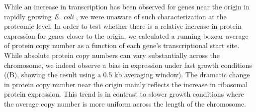 While an increase in transcription has been observed for genes near the origin
in rapidly growing \textit{E. coli}  \citep{scholz2019}, we were unaware of such
characterization at the proteomic level. In order to test whether there is a
relative increase in protein expression for genes closer to the origin, we
calculated a running boxcar average of protein copy number as a function of
each gene's transcriptional start site. While absolute protein copy numbers can vary
substantially across the chromosome, we indeed observe a bias in expression
under fast growth conditions ((B), showing the result
using a 0.5 kb averaging window). The dramatic change in protein copy number
near the origin mainly reflects the increase in ribosomal protein expression.
This trend is in contrast to slower growth conditions where the average copy
number is more uniform across the length of the chromosome.

